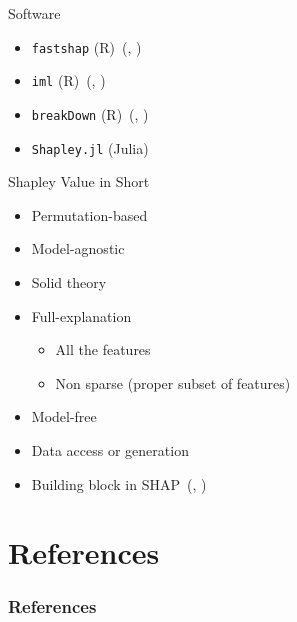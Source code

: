 \documentclass[dvipsnames]{beamer}
\renewcommand{\cite}[1]{(\citeauthor{#1}, \citeyear{#1})}
\begin{document}


%

\begin{frame}[fragile]{Software}
	\begin{itemize}\setlength\itemsep{2em}
		\item \verb|fastshap| (R)~\cite{jethani2021fastshap}
		\item \verb|iml| (R)~\cite{molnar2018iml}
		\item \verb|breakDown| (R)~\cite{staniak2018explanations}
		\item \verb|Shapley.jl| (Julia)~\footnotemark
	\end{itemize}
\end{frame}

\begin{frame}{Shapley Value in Short}
	\begin{itemize}\setlength\itemsep{1em}
		\item Permutation-based
		\item Model-agnostic
		\item Solid theory
		\item Full-explanation
		\begin{itemize}
			\item All the features
			\item Non sparse (proper subset of features)
		\end{itemize}
		\item Model-free
		\item Data access or generation
		\item Building block in SHAP~\cite{lundberg2017unified}
	\end{itemize}
\end{frame}

\section{References}
\begin{frame}[allowframebreaks]
\frametitle{References}
\printbibliography
\end{frame}
\end{document}

